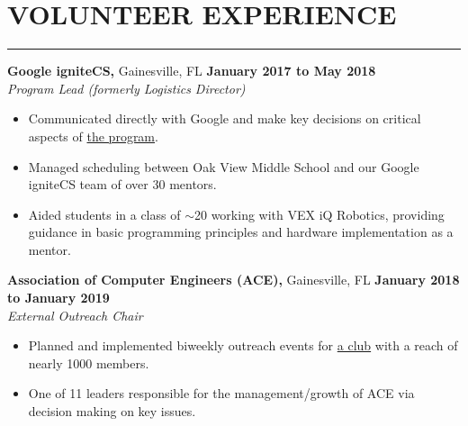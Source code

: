 \section*{VOLUNTEER EXPERIENCE}

\hrule \relax
\sectionheaderspace

\noindent\textbf{Google igniteCS,} Gainesville, FL \hfill\textbf{January 2017 to May 2018}\\
\textit{Program Lead (formerly Logistics Director)}
\begin{itemize}[noitemsep,nolistsep, label = {-}]
	\item Communicated directly with Google and make key decisions on critical aspects of \href{https://sites.google.com/view/ignitecs/home}{the program}.
	\item Managed scheduling between Oak View Middle School and our Google igniteCS team of over 30 mentors.
	\item Aided students in a class of $\sim$20 working with VEX iQ Robotics, providing guidance in basic programming principles and hardware implementation as a mentor.
\end{itemize} 
\subsectionspace

\noindent\textbf{Association of Computer Engineers (ACE),} Gainesville, FL \hfill\textbf{January 2018 to January 2019}\\
\textit{External Outreach Chair}
\begin{itemize}[noitemsep,nolistsep, label={-}]
	\item Planned and implemented biweekly outreach events for \href{https://uf-ace.com/}{a club} with a reach of nearly 1000 members.
	\item One of 11 leaders responsible for the management/growth of ACE via decision making on key issues.
\end{itemize}
\subsectionspace